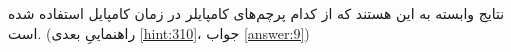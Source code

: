 \section{}
\paragraph{}\label{hint:129}
نتایج وابسته به این هستند که از کدام پرچم‌های کامپایلر در زمان کامپایل استفاده شده است. (راهنماییِ بعدی \ref{hint:310}، جواب \ref{answer:9})